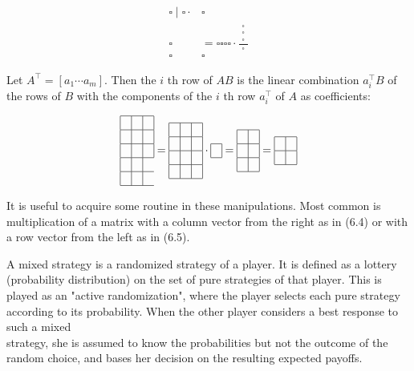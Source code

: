 \documentclass[12pt]{article}
\begin{document}
\[
\begin{array}{|l|l|}
\square \mid \square \cdot & \square  \tag{6.5}\\
\square & =\square \square \square \square \cdot \frac{\begin{array}{l|}
\square \\
\square \\
\square
\end{array}}{\square} \\
\square & \square
\end{array}
\]

Let $A^{\top}=\left[a_{1} \cdots a_{m}\right]$. Then the $i$ th row of $A B$ is the linear combination $a_{i}^{\top} B$ of the rows of $B$ with the components of the $i$ th row $a_{i}^{\top}$ of $A$ as coefficients:

$$
\begin{array}{|l|l|l|}
\hline & & \\
\hline & & \\
\hline & & \\
\hline & \\
\hline & \\
\hline
\end{array}=\begin{array}{|l|l|l|}
\hline & & \\
\hline & & \\
\hline & & \\
\hline & & \\
\hline
\end{array} \cdot \begin{array}{|l|}
\hline \\
\hline
\end{array}=\begin{array}{|l|l|}
\hline & \\
\hline & \\
\hline & \\
\hline
\end{array}=\begin{array}{|l|l|}
\hline & \\
\hline & \\
\hline
\end{array}
$$

It is useful to acquire some routine in these manipulations. Most common is multiplication of a matrix with a column vector from the right as in (6.4) or with a row vector from the left as in (6.5).

A mixed strategy is a randomized strategy of a player. It is defined as a lottery (probability distribution) on the set of pure strategies of that player. This is played as an "active randomization", where the player selects each pure strategy according to its probability. When the other player considers a best response to such a mixed\\
strategy, she is assumed to know the probabilities but not the outcome of the random choice, and bases her decision on the resulting expected payoffs.
\end{document}
